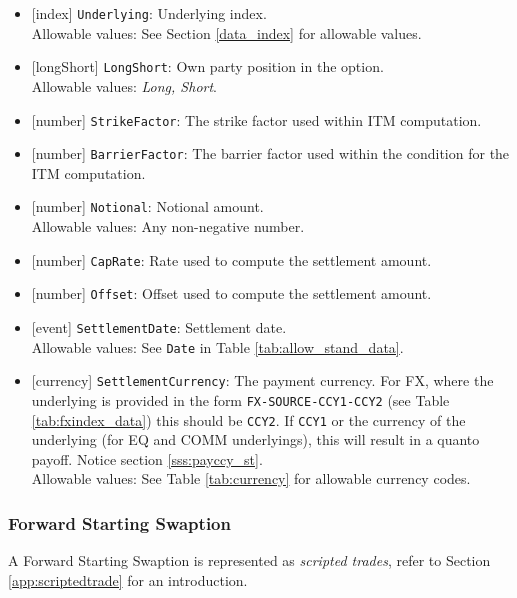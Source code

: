 \begin{itemize}
  \item{}[index] \lstinline!Underlying!: Underlying index. \\
  Allowable values: See Section \ref{data_index} for allowable values.
  \item{}[longShort] \lstinline!LongShort!: Own party position in the option. \\
  Allowable values: \emph{Long, Short}.
  \item{}[number] \lstinline!StrikeFactor!: The strike factor used within ITM computation.
  \item{}[number] \lstinline!BarrierFactor!: The barrier factor used within the condition for the ITM computation.
  \item{}[number] \lstinline!Notional!: Notional amount. \\
  Allowable values: Any non-negative number.
  \item{}[number] \lstinline!CapRate!: Rate used to compute the settlement amount.
  \item{}[number] \lstinline!Offset!: Offset used to compute the settlement amount.
  \item{}[event] \lstinline!SettlementDate!: Settlement date. \\
  Allowable values: See \lstinline!Date! in Table \ref{tab:allow_stand_data}.
  \item{}[currency] \lstinline!SettlementCurrency!: The payment currency. For FX, where the underlying is provided
      in the form \lstinline!FX-SOURCE-CCY1-CCY2! (see Table \ref{tab:fxindex_data}) this should
      be \lstinline!CCY2!. If \lstinline!CCY1! or the currency of the underlying (for EQ and
      COMM underlyings), this will result in a quanto payoff. Notice section \ref{sss:payccy_st}. \\
        Allowable values: See Table \ref{tab:currency} for allowable currency codes.
\end{itemize}

\subsubsection{Forward Starting Swaption}


A Forward Starting Swaption is represented as {\em scripted trades}, refer to Section
\ref{app:scriptedtrade} for an introduction.

